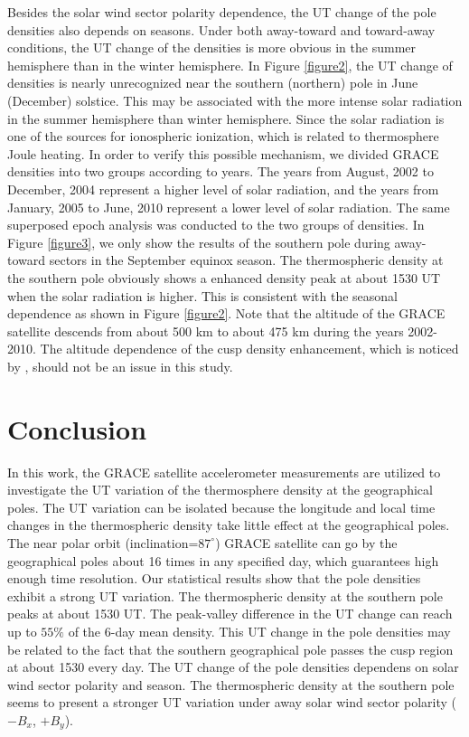 \documentclass[draft, grl]{/home/guod/Documents/template/agu_template/AGUTeX}
\begin{document}
\begin{article}
    Besides the solar wind sector polarity dependence, the UT change of the pole
    densities also depends on seasons. Under both away-toward and toward-away
    conditions, the UT change of the densities is more obvious in the summer
    hemisphere than in the winter hemisphere. In Figure \ref{figure2}, the UT
    change of densities is nearly unrecognized near the southern (northern) pole
    in June (December) solstice. This may be associated with the more intense 
    solar radiation in the summer hemisphere than winter hemisphere. Since the
    solar radiation is one of the sources for ionospheric ionization, which is
    related to thermosphere Joule heating. In order to verify this possible 
    mechanism, we divided GRACE densities into two groups according to years.
    The years from August, 2002 to December, 2004 represent a higher level of
    solar radiation, and the years from January, 2005 to June, 2010 represent 
    a lower level of solar radiation. The same superposed epoch analysis was
    conducted to the two groups of densities. In Figure \ref{figure3}, we only 
    show the results of the southern pole during away-toward sectors in the
    September equinox season. The thermospheric density at the southern pole 
    obviously shows a enhanced density peak at about 1530 UT when the solar
    radiation is higher. This is consistent with the seasonal dependence as 
    shown in Figure \ref{figure2}. Note that the altitude of the GRACE satellite
    descends from about 500 km to about 475 km during the years 2002-2010. The
    altitude dependence of the cusp density enhancement, which is noticed by 
    \citet{Clemmons2008}, should not be an issue in this study.

\section{Conclusion}
    In this work, the GRACE satellite accelerometer measurements are utilized
    to investigate the UT variation of the thermosphere density at the 
    geographical poles. 
    The UT variation can be isolated because the longitude and local time 
    changes in the thermospheric density take little effect at the geographical
    poles. 
    The near polar orbit (inclination=$87^\circ$) GRACE satellite can go by
    the geographical poles about 16 times in any specified day, which guarantees
    high enough time resolution. 
    Our statistical results show that the pole densities exhibit a strong UT 
    variation. 
    The thermospheric density at the southern pole peaks at about 1530 UT.
    The peak-valley difference in the UT change can reach up to $55\%$ of the 
    6-day mean density.
    This UT change in the pole densities may be related to the fact that the 
    southern geographical pole passes the cusp region at about 1530 every day.
    The UT change of the pole densities dependens on solar wind sector 
    polarity and season.
    The thermospheric density at the southern pole seems to present a stronger
    UT variation under away solar wind sector polarity ($-B_x$, $+B_y$).



\end{article}
\end{document}
